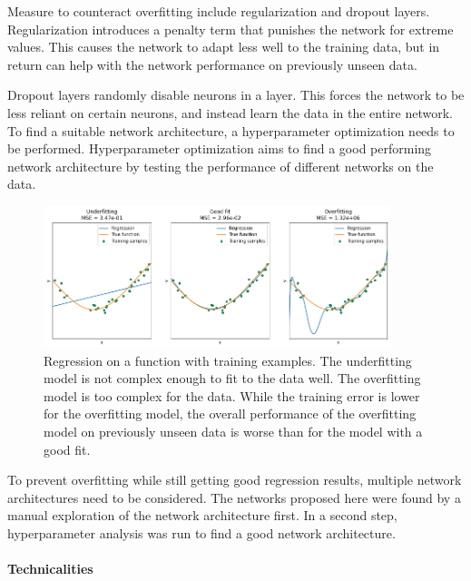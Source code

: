 Measure to counteract overfitting include regularization and dropout layers.
Regularization introduces a penalty term that punishes the network for extreme values.
This causes the network to adapt less well to the training data, but in return can help with the network
performance on previously unseen data.

Dropout layers randomly disable neurons in a layer.
This forces the network to be less reliant on certain neurons, and instead learn the data in the entire network.
\\

To find a suitable network architecture, a hyperparameter optimization needs to be performed.
Hyperparameter optimization aims to find a good performing network architecture by testing the performance
of different networks on the data.

\begin{figure} [h]
    \centering
    \includegraphics[width=0.9\textwidth]{figures/regression/overfitting.png} 
    \caption[Overfitting]{Regression on a function with training examples. 
            The underfitting model is not complex enough to fit to the data well. 
            The overfitting model is too complex for the data.
            While the training error is lower for the overfitting model, 
            the overall performance of the overfitting model on previously unseen data 
            is worse than for the model with a good fit.
        }
    \label{fig:overfitting}
\end{figure}
  
To prevent overfitting while still getting good regression results, multiple network architectures need to be considered.
The networks proposed here were found by a manual exploration of the network architecture first.
In a second step, hyperparameter analysis was run to find a good network architecture.

\paragraph{Technicalities}

